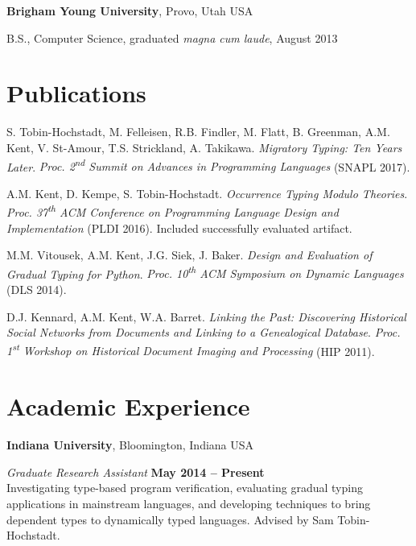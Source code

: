 \documentclass[margin,line]{res}
\newcommand{\ts}{\textsuperscript}
\newenvironment{list1}{
  \begin{list}{\ding{113}}{%
      \setlength{\itemsep}{0in}
      \setlength{\parsep}{0in} \setlength{\parskip}{0in}
      \setlength{\topsep}{0in} \setlength{\partopsep}{0in} 
      \setlength{\leftmargin}{0.17in}}}{\end{list}}
\begin{document}
\begin{resume}
{\bf Brigham Young University}, Provo, Utah USA\\
\vspace*{-.1in}
\begin{list1}
\item[] B.S., Computer Science, graduated \emph{magna cum laude}, August 2013
\end{list1}

\section{\sc Publications}



S. Tobin-Hochstadt, M. Felleisen, R.B. Findler, M. Flatt, B. Greenman,
A.M. Kent, V. St-Amour, T.S. Strickland, A. Takikawa. \emph{Migratory
  Typing: Ten Years Later}. {\em Proc. 2\ts{nd} Summit on Advances in
  Programming Languages} (SNAPL 2017).

A.M. Kent, D. Kempe, S. Tobin-Hochstadt. \emph{Occurrence Typing
  Modulo Theories}. {\em Proc. 37\ts{th} ACM Conference on Programming
  Language Design and Implementation} (PLDI 2016). Included
  successfully evaluated artifact.

M.M. Vitousek, A.M. Kent, J.G. Siek, J. Baker. \emph{Design and
  Evaluation of Gradual Typing for Python}. {\em Proc.  10\ts{th} ACM
    Symposium on Dynamic Languages} (DLS 2014).

D.J. Kennard, A.M. Kent, W.A. Barret. \emph{Linking the Past:
  Discovering Historical Social Networks from Documents and Linking to
  a Genealogical Database}. {\em Proc. 1\ts{st} Workshop on Historical
  Document Imaging and Processing} (HIP 2011).

%

\section{\sc Academic Experience}
{\bf Indiana University}, Bloomington, Indiana USA

\vspace{-.3cm}
{\em Graduate Research Assistant} \hfill {\bf May 2014 -- Present}\\
Investigating type-based program verification, evaluating gradual
typing applications in mainstream languages, and developing techniques
to bring dependent types to dynamically typed languages. Advised by
Sam Tobin-Hochstadt.


\end{resume}
\end{document}
